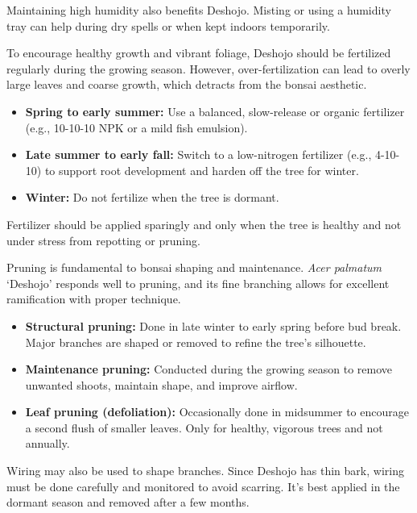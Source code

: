 Maintaining high humidity also benefits Deshojo. Misting or using a humidity tray can help during dry spells or when kept indoors temporarily.

\medskip
{}
\noindent
To encourage healthy growth and vibrant foliage, Deshojo should be fertilized regularly during the growing season. However, over-fertilization can lead to overly large leaves and coarse growth, which detracts from the bonsai aesthetic.

\begin{itemize}
    \item \textbf{Spring to early summer:} Use a balanced, slow-release or organic fertilizer (e.g., 10-10-10 NPK or a mild fish emulsion).
    \item \textbf{Late summer to early fall:} Switch to a low-nitrogen fertilizer (e.g., 4-10-10) to support root development and harden off the tree for winter.
    \item \textbf{Winter:} Do not fertilize when the tree is dormant.
\end{itemize}

Fertilizer should be applied sparingly and only when the tree is healthy and not under stress from repotting or pruning.

\medskip
{}
\noindent
Pruning is fundamental to bonsai shaping and maintenance. \textit{Acer palmatum} ‘Deshojo’ responds well to pruning, and its fine branching allows for excellent ramification with proper technique.

\medskip
{}
\noindent
\begin{itemize}
    \item \textbf{Structural pruning:} Done in late winter to early spring before bud break. Major branches are shaped or removed to refine the tree’s silhouette.
    \item \textbf{Maintenance pruning:} Conducted during the growing season to remove unwanted shoots, maintain shape, and improve airflow.
    \item \textbf{Leaf pruning (defoliation):} Occasionally done in midsummer to encourage a second flush of smaller leaves. Only for healthy, vigorous trees and not annually.
\end{itemize}

Wiring may also be used to shape branches. Since Deshojo has thin bark, wiring must be done carefully and monitored to avoid scarring. It’s best applied in the dormant season and removed after a few months.

